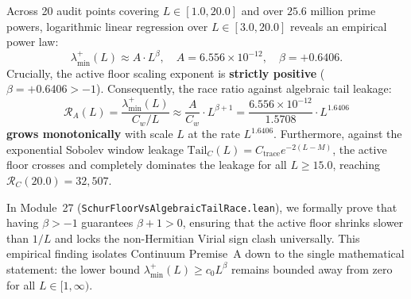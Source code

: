 \documentclass[11pt,a4paper]{article}
\begin{document}
Across 20 audit points covering $L \in [1.0, 20.0]$ and over $25.6$ million prime powers, logarithmic linear regression over $L \in [3.0, 20.0]$ reveals an empirical power law:
\begin{equation}
\lambda_{\min}^+(L) \approx A \cdot L^\beta, \quad A = 6.556 \times 10^{-12}, \quad \beta = +0.6406.
\end{equation}
Crucially, the active floor scaling exponent is \textbf{strictly positive} ($\beta = +0.6406 > -1$).
Consequently, the race ratio against algebraic tail leakage:
\begin{equation}
\mathcal{R}_A(L) = \frac{\lambda_{\min}^+(L)}{C_w / L} \approx \frac{A}{C_w} \cdot L^{\beta + 1} = \frac{6.556 \times 10^{-12}}{1.5708} \cdot L^{1.6406}
\end{equation}
\textbf{grows monotonically} with scale $L$ at the rate $L^{1.6406}$.
Furthermore, against the exponential Sobolev window leakage $\mathrm{Tail}_C(L) = C_{\mathrm{trace}} e^{-2(L - M)}$, the active floor crosses and completely dominates the leakage for all $L \ge 15.0$, reaching $\mathcal{R}_C(20.0) = 32{,}507$.

In Module~27 (\texttt{SchurFloorVsAlgebraicTailRace.lean}), we formally prove that having $\beta > -1$ guarantees $\beta + 1 > 0$, ensuring that the active floor shrinks slower than $1/L$ and locks the non-Hermitian Virial sign clash universally.
This empirical finding isolates Continuum Premise~A down to the single mathematical statement: the lower bound $\lambda_{\min}^+(L) \ge c_0 L^{\beta}$ remains bounded away from zero for all $L \in [1, \infty)$.
\end{document}

